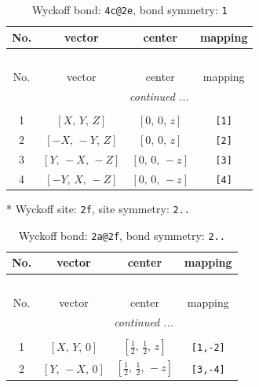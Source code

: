 \documentclass[fleqn,8pt]{jsarticle}
\begin{document}
\begin{longtable}{cccc}
\caption{Wyckoff bond: {\tt 4c@2e}, bond symmetry: {\tt 1}}
 \\
 \hline \hline
No. & vector & center & mapping \\ \hline \endfirsthead

\multicolumn{3}{l}{\tablename\ \thetable{}} \\
 \hline \hline
No. & vector & center & mapping \\ \hline \endhead

 \hline \hline
\multicolumn{3}{r}{\footnotesize\it continued ...} \\ \endfoot

 \hline \hline
\multicolumn{3}{r}{} \\ \endlastfoot

1 & $\left[ X,\, Y,\, Z \right]$ & $\left[ 0,\, 0,\, z \right]$ & {\tt [1]} \\ \hline
2 & $\left[ - X,\, - Y,\, Z \right]$ & $\left[ 0,\, 0,\, z \right]$ & {\tt [2]} \\ \hline
3 & $\left[ Y,\, - X,\, - Z \right]$ & $\left[ 0,\, 0,\, - z \right]$ & {\tt [3]} \\ \hline
4 & $\left[ - Y,\, X,\, - Z \right]$ & $\left[ 0,\, 0,\, - z \right]$ & {\tt [4]} \\
\end{longtable}
* Wyckoff site: {\tt 2f}, site symmetry: {\tt 2..}
\renewcommand{\arraystretch}{1.2}
\begin{longtable}{cccc}
\caption{Wyckoff bond: {\tt 2a@2f}, bond symmetry: {\tt 2..}}
 \\
 \hline \hline
No. & vector & center & mapping \\ \hline \endfirsthead

\multicolumn{3}{l}{\tablename\ \thetable{}} \\
 \hline \hline
No. & vector & center & mapping \\ \hline \endhead

 \hline \hline
\multicolumn{3}{r}{\footnotesize\it continued ...} \\ \endfoot

 \hline \hline
\multicolumn{3}{r}{} \\ \endlastfoot

1 & $\left[ X,\, Y,\, 0 \right]$ & $\left[ \frac{1}{2},\, \frac{1}{2},\, z \right]$ & {\tt [1,-2]} \\ \hline
2 & $\left[ Y,\, - X,\, 0 \right]$ & $\left[ \frac{1}{2},\, \frac{1}{2},\, - z \right]$ & {\tt [3,-4]} \\
\end{longtable}
\end{document}
